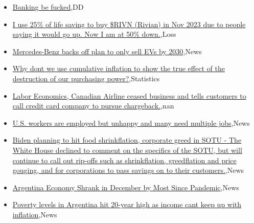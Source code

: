 \documentclass{article}%
\begin{document}
%
\begin{itemize}%
\item%
\href{https://reddit.com/r/wallstreetbets/comments/1ayr57w/banking\_be\_fucked/}{Banking be fucked},DD%
\item%
\href{https://reddit.com/r/wallstreetbets/comments/1ayqi5e/i\_use\_25\_of\_life\_saving\_to\_buy\_rivn\_rivian\_in\_nov/}{I use 25\% of life saving to buy \$RIVN (Rivian) in Nov 2023 due to people saying it would go up. Now I am at 50\% down.},Loss%
\item%
\href{https://reddit.com/r/StockMarket/comments/1ay88ku/mercedesbenz\_backs\_off\_plan\_to\_only\_sell\_evs\_by/}{Mercedes-Benz backs off plan to only sell EVs by 2030},News%
\item%
\href{https://reddit.com/r/Economics/comments/1ayktlh/why\_dont\_we\_use\_cumulative\_inflation\_to\_show\_the/}{Why dont we use cumulative inflation to show the true effect of the destruction of our purchasing power?},Statistics%
\item%
\href{https://reddit.com/r/Economics/comments/1ayg3sb/labor\_economics\_canadian\_airline\_ceased\_business/}{Labor Economics, Canadian Airline ceased business and tells customers to call credit card company to pursue chargeback.},nan%
\item%
\href{https://reddit.com/r/Economics/comments/1aydfif/us\_workers\_are\_employed\_but\_unhappy\_and\_many\_need/}{U.S. workers are employed but unhappy and many need multiple jobs},News%
\item%
\href{https://reddit.com/r/Economics/comments/1aycg1h/biden\_planning\_to\_hit\_food\_shrinkflation/}{Biden planning to hit food shrinkflation, corporate greed in SOTU - The White House declined to comment on the specifics of the SOTU, but will continue to call out rip-offs such as shrinkflation, greedflation and price gouging, and for corporations to pass savings on to their customers.},News%
\item%
\href{https://reddit.com/r/Economics/comments/1aybthm/argentina\_economy\_shrank\_in\_december\_by\_most/}{Argentina Economy Shrank in December by Most Since Pandemic},News%
\item%
\href{https://reddit.com/r/Economics/comments/1aya1z7/poverty\_levels\_in\_argentina\_hit\_20year\_high\_as/}{Poverty levels in Argentina hit 20-year high as income cant keep up with inflation},News%
\end{itemize}%
\end{document}
